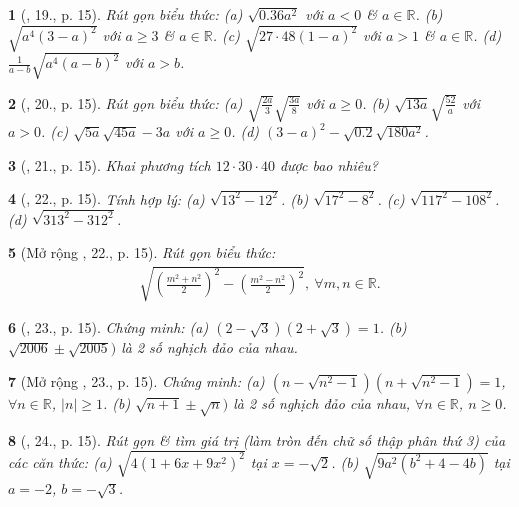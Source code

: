 \documentclass{article}
\newtheorem{baitoan}{}%
\begin{document}
\begin{baitoan}[\cite{SGK_Toan_9_tap_1}, 19., p. 15]
	Rút gọn biểu thức: (a) $\sqrt{0.36a^2}$ với $a < 0$ \& $a\in\mathbb{R}$. (b) $\sqrt{a^4(3 - a)^2}$ với $a\ge3$ \& $a\in\mathbb{R}$. (c) $\sqrt{27\cdot48(1 - a)^2}$ với $a > 1$ \& $a\in\mathbb{R}$. (d) $\frac{1}{a - b}\sqrt{a^4(a - b)^2}$ với $a > b$.
\end{baitoan}

\begin{baitoan}[\cite{SGK_Toan_9_tap_1}, 20., p. 15]
	Rút gọn biểu thức: (a) $\sqrt{\frac{2a}{3}}\sqrt{\frac{3a}{8}}$ với $a\ge0$. (b) $\sqrt{13a}\sqrt{\frac{52}{a}}$ với $a > 0$. (c) $\sqrt{5a}\sqrt{45a} - 3a$ với $a\ge0$. (d) $(3 - a)^2 - \sqrt{0.2}\sqrt{180a^2}$.
\end{baitoan}

\begin{baitoan}[\cite{SGK_Toan_9_tap_1}, 21., p. 15]
	Khai phương tích $12\cdot30\cdot40$ được bao nhiêu?
\end{baitoan}

\begin{baitoan}[\cite{SGK_Toan_9_tap_1}, 22., p. 15]
	Tính hợp lý: (a) $\sqrt{13^2 - 12^2}$. (b) $\sqrt{17^2 - 8^2}$. (c) $\sqrt{117^2 - 108^2}$. (d) $\sqrt{313^2 - 312^2}$.
\end{baitoan}

\begin{baitoan}[Mở rộng \cite{SGK_Toan_9_tap_1}, 22., p. 15]
	Rút gọn biểu thức:
	\begin{align*}
		\sqrt{\left(\frac{m^2 + n^2}{2}\right)^2 - \left(\frac{m^2 - n^2}{2}\right)^2},\ \forall m,n\in\mathbb{R}.
	\end{align*}
\end{baitoan}

\begin{baitoan}[\cite{SGK_Toan_9_tap_1}, 23., p. 15]
	Chứng minh: (a) $(2 - \sqrt{3})(2 + \sqrt{3}) = 1$. (b) $\sqrt{2006}\pm\sqrt{2005})$ là 2 số nghịch đảo của nhau.
\end{baitoan}

\begin{baitoan}[Mở rộng \cite{SGK_Toan_9_tap_1}, 23., p. 15]
	Chứng minh: (a) $(n - \sqrt{n^2 - 1})(n + \sqrt{n^2 - 1}) = 1$, $\forall n\in\mathbb{R}$, $|n|\ge1$. (b) $\sqrt{n + 1}\pm\sqrt{n})$ là 2 số nghịch đảo của nhau, $\forall n\in\mathbb{R}$, $n\ge0$.
\end{baitoan}

\begin{baitoan}[\cite{SGK_Toan_9_tap_1}, 24., p. 15]
	Rút gọn \& tìm giá trị (làm tròn đến chữ số thập phân thứ 3) của các căn thức: (a) $\sqrt{4(1 + 6x + 9x^2)^2}$ tại $x = -\sqrt{2}$. (b) $\sqrt{9a^2(b^2 + 4 - 4b)}$ tại $a = -2$, $b = -\sqrt{3}$. 
\end{baitoan}
\end{document}

